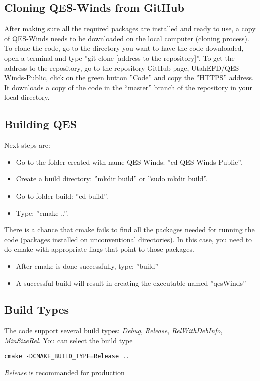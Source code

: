 \subsection{Cloning QES-Winds from GitHub}

After making sure all the required packages are installed and ready to use, a copy of QES-Winds needs to be downloaded on the local computer (cloning process). To clone the code, go to the directory you want to have the code downloaded, open a terminal and type ''git clone [address to the repository]''. To get the address to the repository, go to the repository GitHub page, UtahEFD/QES-Winds-Public, click on the green button ''Code'' and copy the ''HTTPS'' address. It downloads a copy of the code in the “master” branch of the repository in your local directory.

\subsection{Building QES}

Next steps are:
\begin{itemize}
    \item Go to the folder created with name QES-Winds: ''cd QES-Winds-Public''.
    \item Create a build directory: ''mkdir build'' or ''sudo mkdir build''.
    \item Go to folder build: ''cd build''.
    \item Type: ''cmake ..''.
\end{itemize}

There is a chance that cmake fails to find all the packages needed for running the code (packages installed on unconventional directories). In this case, you need to do cmake with appropriate flags that point to those packages.

\begin{itemize}
    \item After cmake is done successfully, type: ''build''
    \item A successful build will result in creating the executable named ''qesWinds''
\end{itemize}
\subsection{Build Types}

The code support several build types: \textit{Debug}, \textit{Release}, \textit{RelWithDebInfo}, \textit{MinSizeRel}. You can select the build type
\begin{verbatim}
cmake -DCMAKE_BUILD_TYPE=Release ..
\end{verbatim}
\textit{Release} is recommanded for production

